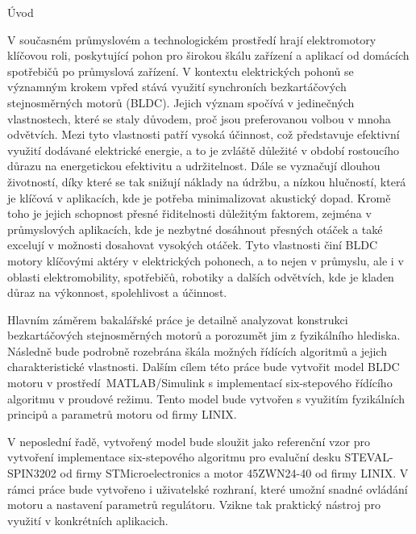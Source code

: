 
\def\ctustyle{{\ssr CTUstyle}}
\def\ttb{\tt\char`\\} %

\chap Úvod


V současném průmyslovém a technologickém prostředí hrají elektromotory klíčovou roli, poskytující pohon pro širokou 
škálu zařízení a aplikací od domácích spotřebičů po průmyslová zařízení. V kontextu elektrických pohonů se významným krokem 
vpřed stává využití synchroních bezkartáčových stejnosměrných motorů (BLDC). Jejich význam spočívá 
v jedinečných vlastnostech, které se staly důvodem, proč jsou preferovanou volbou v mnoha odvětvích. 
Mezi tyto vlastnosti patří vysoká účinnost, což představuje efektivní využití dodávané elektrické energie, a to je zvláště 
důležité v období rostoucího důrazu na energetickou efektivitu a udržitelnost. Dále se vyznačují dlouhou životností, díky které se
 tak snižují náklady na údržbu, a nízkou hlučností, která je klíčová v aplikacích, kde je potřeba minimalizovat akustický dopad. 
Kromě toho je jejich schopnost přesné řiditelnosti důležitým faktorem, zejména v průmyslových aplikacích, kde je nezbytné 
dosáhnout přesných otáček a také excelují v možnosti dosahovat vysokých otáček. Tyto vlastnosti činí BLDC motory klíčovými aktéry v elektrických pohonech, a to 
nejen v průmyslu, ale i v oblasti elektromobility, spotřebičů, robotiky a dalších odvětvích, kde je kladen důraz na 
výkonnost, spolehlivost a účinnost.

Hlavním záměrem bakalářské práce je detailně analyzovat konstrukci bezkartáčových stejnosměrných motorů a porozumět 
jim z fyzikálního hlediska. Následně bude podrobně rozebrána škála možných řídících algoritmů a jejich charakteristické
vlastnosti. Dalším cílem této práce bude vytvořit model BLDC motoru v prostředí~\nobreak{}MATLAB/Simulink s implementací \nobreak{}six-stepového
řídícího algoritmu v proudové režimu. Tento model bude vytvořen s využitím fyzikálních principů a parametrů motoru od 
firmy LINIX.

V neposlední řadě, vytvořený model bude sloužit jako referenční vzor pro vytvoření implementace six-stepového algoritmu pro evaluční 
desku STEVAL-\nobreak{}SPIN3202 od firmy STMicroelectronics a motor 45ZWN24-40 od firmy LINIX. V rámci práce bude vytvořeno i uživatelské rozhraní, které 
umožní snadné ovládání motoru a nastavení parametrů regulátoru. Vzikne tak 
praktický nástroj pro využití v konkrétních aplikacich. 

